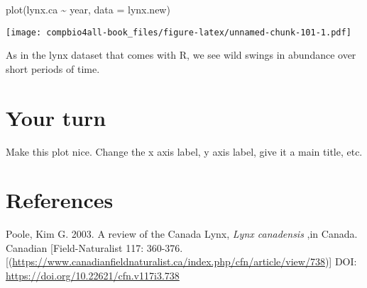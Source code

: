 \documentclass[
]{book}
\newenvironment{Shaded}{\begin{snugshade}}{\end{snugshade}}
\newcommand{\AttributeTok}[1]{\textcolor[rgb]{0.77,0.63,0.00}{#1}}
\newcommand{\FunctionTok}[1]{\textcolor[rgb]{0.00,0.00,0.00}{#1}}
\newcommand{\NormalTok}[1]{#1}
\newcommand{\SpecialCharTok}[1]{\textcolor[rgb]{0.00,0.00,0.00}{#1}}
\begin{document}
\begin{Shaded}
\begin{Highlighting}[]
\FunctionTok{plot}\NormalTok{(lynx.ca }\SpecialCharTok{\textasciitilde{}}\NormalTok{ year, }\AttributeTok{data =}\NormalTok{ lynx.new)}
\end{Highlighting}
\end{Shaded}

\texttt{[image: compbio4all-book\_files/figure-latex/unnamed-chunk-101-1.pdf]}

As in the lynx dataset that comes with R, we see wild swings in abundance over short periods of time.

\hypertarget{your-turn-1}{%
\section{Your turn}\label{your-turn-1}}

Make this plot nice. Change the x axis label, y axis label, give it a main title, etc.

\hypertarget{references-1}{%
\section{References}\label{references-1}}

Poole, Kim G. 2003. A review of the Canada Lynx, \emph{Lynx canadensis} ,in Canada. Canadian {[}Field-Naturalist 117: 360-376.{[}(\url{https://www.canadianfieldnaturalist.ca/index.php/cfn/article/view/738}){]} DOI: \url{https://doi.org/10.22621/cfn.v117i3.738}

  
\end{document}
